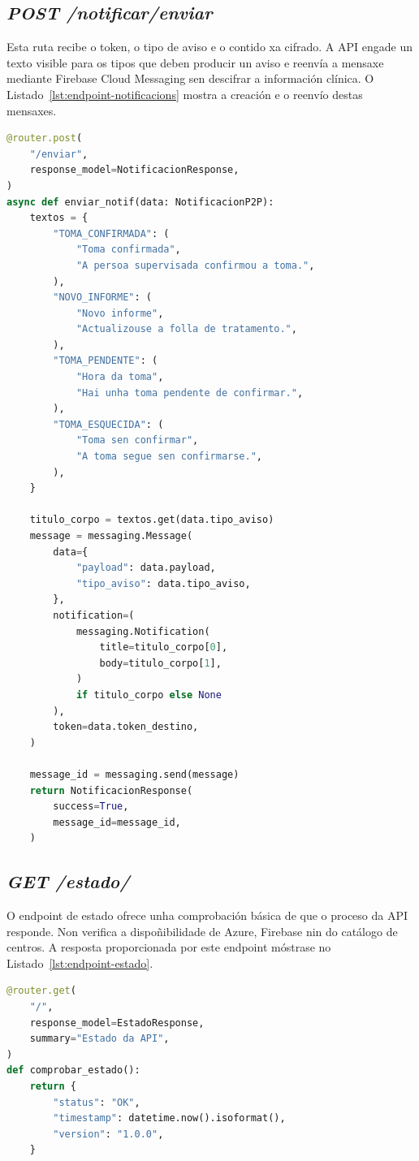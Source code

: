 \subsection{\textit{POST /notificar/enviar}}
Esta ruta recibe o token, o tipo de aviso e o contido xa cifrado. A API engade un texto visible para os tipos que deben producir un aviso e reenvía a mensaxe mediante Firebase Cloud Messaging sen descifrar a información clínica. O Listado~\ref{lst:endpoint-notificacions} mostra a creación e o reenvío destas mensaxes.

\begin{lstlisting}[language=Python,
    caption={Reenvío dunha mensaxe mediante Firebase.},
    label={lst:endpoint-notificacions}]
@router.post(
    "/enviar",
    response_model=NotificacionResponse,
)
async def enviar_notif(data: NotificacionP2P):
    textos = {
        "TOMA_CONFIRMADA": (
            "Toma confirmada",
            "A persoa supervisada confirmou a toma.",
        ),
        "NOVO_INFORME": (
            "Novo informe",
            "Actualizouse a folla de tratamento.",
        ),
        "TOMA_PENDENTE": (
            "Hora da toma",
            "Hai unha toma pendente de confirmar.",
        ),
        "TOMA_ESQUECIDA": (
            "Toma sen confirmar",
            "A toma segue sen confirmarse.",
        ),
    }

    titulo_corpo = textos.get(data.tipo_aviso)
    message = messaging.Message(
        data={
            "payload": data.payload,
            "tipo_aviso": data.tipo_aviso,
        },
        notification=(
            messaging.Notification(
                title=titulo_corpo[0],
                body=titulo_corpo[1],
            )
            if titulo_corpo else None
        ),
        token=data.token_destino,
    )

    message_id = messaging.send(message)
    return NotificacionResponse(
        success=True,
        message_id=message_id,
    )
\end{lstlisting}

\subsection{\textit{GET /estado/}}
O endpoint de estado ofrece unha comprobación básica de que o proceso da API responde. Non verifica a dispoñibilidade de Azure, Firebase nin do  catálogo de centros. A resposta proporcionada por este endpoint móstrase no Listado~\ref{lst:endpoint-estado}.
\begin{lstlisting}[language=Python,
    caption={Comprobación básica do estado da API.},
    label={lst:endpoint-estado}]
@router.get(
    "/",
    response_model=EstadoResponse,
    summary="Estado da API",
)
def comprobar_estado():
    return {
        "status": "OK",
        "timestamp": datetime.now().isoformat(),
        "version": "1.0.0",
    }
\end{lstlisting}

